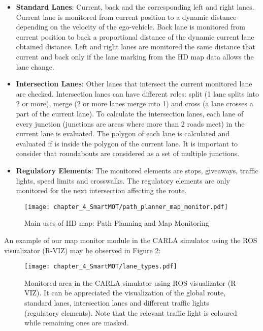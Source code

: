 \begin{itemize}
	
	\item \textbf{Standard Lanes}: Current, back and the corresponding left and right lanes. Current lane is monitored from current position to a dynamic distance depending on the velocity of the ego-vehicle. Back lane is monitored from current position to back a proportional distance of the dynamic current lane obtained distance. Left and right lanes are monitored the same distance that current and back only if the lane marking from the HD map data allows the lane change.
	
	\item \textbf{Intersection Lanes}: Other lanes that intersect the current monitored lane are checked. Intersection lanes can have different roles: split (1 lane splits into 2 or more), merge (2 or more lanes merge into 1) and cross (a lane crosses a part of the current lane). To calculate the intersection lanes, each lane of every junction (junctions are areas where more than 2 roads meet) in the current lane is evaluated. The polygon of each lane is calculated and evaluated if is inside the polygon of the current lane. It is important to consider that roundabouts are considered as a set of multiple junctions. 
	
	\item \textbf{Regulatory Elements}: The monitored elements are stops, giveaways, traffic lights, speed limits and crosswalks. The regulatory elements are only monitored for the next intersection affecting the route. 
	
\end{itemize}

\begin{figure}[] 
	\centering
	\texttt{[image: chapter\_4\_SmartMOT/path\_planner\_map\_monitor.pdf]}
	\caption{Main uses of HD map: Path Planning and Map Monitoring}
	\label{fig:chapter_4_SmartMOT/path_planner_map_monitor}
\end{figure}

An example of our map monitor module in the CARLA simulator \cite{dosovitskiy2017carla} using the ROS \cite{quigley2009ros} visualizator (R-VIZ) may be observed in Figure \ref{fig:chapter_4_SmartMOT/monitored_area_CARLA_ROS}:

\begin{figure}[h] 
	\centering
	\texttt{[image: chapter\_4\_SmartMOT/lane\_types.pdf]}
	\caption[Monitored area in the CARLA simulator using ROS visualizator (R-VIZ)]{Monitored area in the CARLA simulator using ROS visualizator (R-VIZ). It can be appreciated the visualization of the global route, standard lanes, intersection lanes and different traffic lights (regulatory elements). Note that the relevant traffic light is coloured while remaining ones are masked.}
	\label{fig:chapter_4_SmartMOT/monitored_area_CARLA_ROS}
\end{figure}

